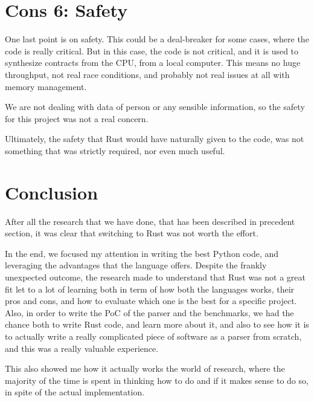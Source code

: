 \section[Safety]{Cons 6: Safety}
One last point is on safety. This could be a deal-breaker for some cases, where
the code is really critical. But in this case, the code is not critical, and it is
used to synthesize contracts from the CPU, from a local computer. This means no huge
throughput, not real race conditions, and probably not real issues at all with memory
management.

We are not dealing with data of person or any sensible information, so the
safety for this project was not a real concern.

Ultimately, the safety that Rust would have naturally given to the code, was not
something that was strictly required, nor even much useful.

\section[Conclusion]{Conclusion}
After all the research that we have done, that has been described in precedent
section, it was clear that switching to Rust was not worth the effort.

In the end, we focused my attention in writing the best Python code, and leveraging
the advantages that the language offers. Despite the frankly unexpected outcome,
the research made to understand that Rust was not a great fit let to a lot of learning
both in term of how both the languages works, their pros and cons, and how to evaluate
which one is the best for a specific project. Also, in order to write the PoC of
the parser and the benchmarks, we had the chance both to write Rust code, and learn
more about it, and also to see how it is to actually write a really complicated
piece of software as a parser from scratch, and this was a really valuable experience.

This also showed me how it actually works the world of research, where the
majority of the time is spent in thinking how to do and if it makes sense to do
so, in spite of the actual implementation.